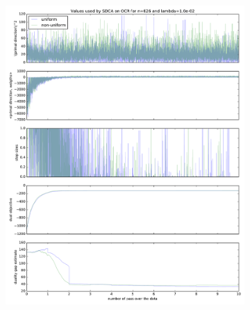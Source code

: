 \documentclass{beamer}
\DeclareMathOperator{\1}{\mathbb{1}}
\begin{document}
\begin{frame}
\begin{figure}
\begin{subfigure}[t]{0.3\textwidth}
        \includegraphics[width=\textwidth]{images/20170914_041645_ocr_annex.pdf}
    \end{subfigure}
    ~
    \begin{subfigure}[t]{0.3\textwidth}
        \centering

\end{subfigure}
\end{figure}
\end{frame}
\end{document}
